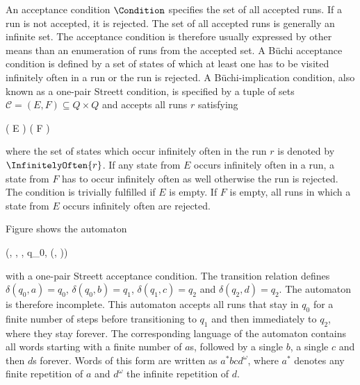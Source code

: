 \startsubsection[title={Acceptance Conditions},reference=sec:theory-automata-acceptance]

    An acceptance condition $\Condition$ specifies the set of all accepted runs.
    If a run is not accepted, it is rejected.
    The set of all accepted runs is generally an infinite set.
    The acceptance condition is therefore usually expressed by other means than an enumeration of runs from the accepted set.
    A Büchi acceptance condition is defined by a set of states of which at least one has to be visited infinitely often in a run or the run is rejected.
    A Büchi-implication condition, also known as a one-pair Streett condition, is specified by a tuple of sets $\mathcal{C} = (E, F) \subseteq Q \times Q$ and accepts all runs $r$ satisfying

    \startformula
        ( \cap E \ne \emptyset) \Longrightarrow ( \cap F \ne \emptyset) \EndComma
    \stopformula

    where the set of states which occur infinitely often in the run $r$ is denoted by $\InfinitelyOften{r}$.
    If any state from $E$ occurs infinitely often in a run, a state from $F$ has to occur infinitely often as well otherwise the run is rejected.
    The condition is trivially fulfilled if $E$ is empty.
    If $F$ is empty, all runs in which a state from $E$ occurs infinitely often are rejected.


    Figure  shows the automaton

    \startformula
        (, , \Transition, q_0, (, ))
    \stopformula

    with a one-pair Streett acceptance condition.
    The transition relation defines $\delta(q_0, a) = q_0$, $\delta(q_0, b) = q_1$, $\delta(q_1, c) = q_2$ and $\delta(q_2, d) = q_2$.
    The automaton is therefore incomplete.
    This automaton accepts all runs that stay in $q_0$ for a finite number of steps before transitioning to $q_1$ and then immediately to $q_2$, where they stay forever.
    The corresponding language of the automaton contains all words starting with a finite number of $a$s, followed by a single $b$, a single $c$ and then $d$s forever.
    Words of this form are written as $a^\ast b c d^\omega$, where $a^\ast$ denotes any finite repetition of $a$ and $d^\omega$ the infinite repetition of $d$.

\stopsubsection

